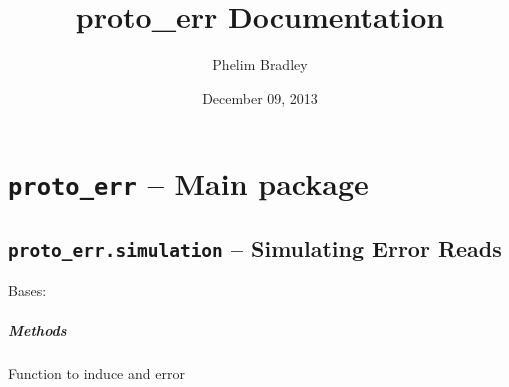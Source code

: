 \documentclass[letterpaper,10pt,english]{sphinxmanual}
\title{proto\_err Documentation}
\date{December 09, 2013}
\author{Phelim Bradley}
\begin{document}
\maketitle
\tableofcontents
{}\label{index::doc}



\chapter{\texttt{proto\_err} -- Main package}
\label{index:proto-err-main-package}\label{index:welcome-to-proto-err-s-documentation}\label{index:module-proto_err}

\section{\texttt{proto\_err.simulation} -- Simulating Error Reads}
\label{index:proto-err-simulation-simulating-error-reads}\label{index:module-proto_err.simulation}

\begin{fulllineitems}
\label{index:proto_err.simulation.complexError}
Bases: {\hyperref[index:proto_err.simulation.simulateError]{}}
\paragraph{Methods}

\begin{fulllineitems}
\label{index:proto_err.simulation.complexError.error}
Function to induce and error

\end{fulllineitems}


\end{fulllineitems}

\end{document}
